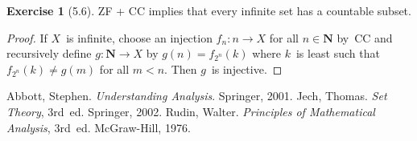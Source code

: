 \documentclass[letterpaper,12pt]{article}
\newcommand{\N}{\boldsymbol{N}}
\theoremstyle{definition}
\newtheorem*{exer}{Exercise}
\theoremstyle{remark}
\begin{document}
\begin{exer}[5.6]
ZF + CC implies that every infinite set has a countable subset.
\end{exer}
\begin{proof}
If \(X\)~is infinite, choose an injection \(f_n:n\to X\) for all \(n\in\N\) by~CC and recursively define \(g:\N\to X\) by \(g(n)=f_{2^n}(k)\) where \(k\)~is least such that \(f_{2^n}(k)\ne g(m)\) for all \(m<n\). Then \(g\)~is injective.
\end{proof}

\begin{thebibliography}{0}
 Abbott, Stephen. \textit{Understanding Analysis}. Springer, 2001.
 Jech, Thomas. \textit{Set Theory}, 3rd~ed. Springer, 2002.
 Rudin, Walter. \textit{Principles of Mathematical Analysis}, 3rd~ed. McGraw-Hill, 1976.
\end{thebibliography}
\end{document}

